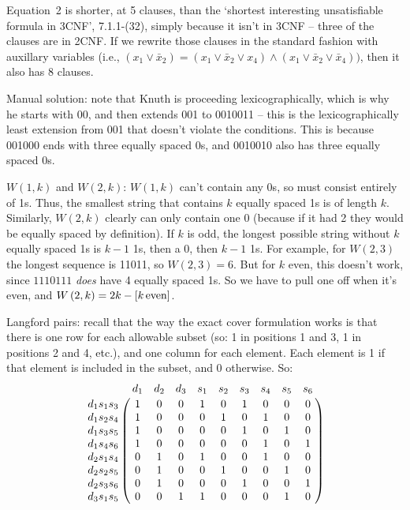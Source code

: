
 Equation~2 is shorter, at 5 clauses, than the `shortest
interesting unsatisfiable formula in 3CNF', 7.1.1-(32), simply because it isn't
in 3CNF -- three of the clauses are in 2CNF.  If we rewrite those clauses in 
the standard fashion with auxillary variables (i.e., $\left(x_1 \vee {\bar x}_2 \right) =
\left(x_1 \vee {\bar x}_2 \vee x_4\right) \wedge \left(x_1 \vee {\bar x}_2 \vee {\bar x}_4\right))$,
then it also has 8 clauses.


 Manual solution: note that Knuth is proceeding lexicographically,
which is why he starts with 00, and then extends 001 to 0010011 -- this
is the lexicographically least extension from 001 that doesn't violate
the conditions.  This is because 001000 ends with three equally spaced 0s,
and 0010010 also has three equally spaced 0s.

 $W\left(1, k\right)$ and $W\left(2, k\right)$: $W\left(1,k\right)$
can't contain any 0s, so must consist entirely of 1s.  Thus, the smallest
string that contains $k$ equally spaced 1s is of length $k$.  
Similarly, $W\left(2, k\right)$ clearly can only contain one 0 (because
if it had 2 they would be equally spaced by definition).  If $k$
is odd, the longest possible string without $k$ equally spaced 1s 
is $k-1$ 1s, then a 0, then $k-1$ 1s.  For example, for
$W\left(2, 3\right)$ the longest sequence is 11011, so
$W\left(2, 3\right) = 6$.  But for $k$ even, this doesn't
work, since $1110111$ {\it does} have 4 equally spaced 1s.
So we have to pull one off when it's even, and
$W\left(2, k\right) = 2 k - \left[ k\, {\rm even} \right]$.


 Langford pairs: recall that the way the exact cover
formulation works is that there is one row for each allowable subset
(so: 1 in positions 1 and 3, 1 in positions 2 and 4, etc.), and one
column for each element.  Each element is 1 if that element
is included in the subset, and 0 otherwise.  So:
$$
 \bordermatrix{
  ~                   & d_1 & d_2 & d_3 & s_1 & s_2 & s_3 & s_4 & s_5 & s_6 \cr
   d_1 s_1 s_3 & 1    & 0     & 0     & 1     & 0     & 1     & 0     & 0     & 0    \cr
   d_1 s_2 s_4 & 1    & 0     & 0     & 0     & 1     & 0     & 1     & 0     & 0    \cr
   d_1 s_3 s_5 & 1    & 0     & 0     & 0     & 0     & 1     & 0     & 1     & 0    \cr
   d_1 s_4 s_6 & 1    & 0     & 0     & 0     & 0     & 0     & 1     & 0     & 1    \cr
   d_2 s_1 s_4 & 0    & 1     & 0     & 1     & 0     & 0     & 1     & 0     & 0    \cr
   d_2 s_2 s_5 & 0    & 1     & 0     & 0     & 1     & 0     & 0     & 1     & 0    \cr
   d_2 s_3 s_6 & 0    & 1     & 0     & 0     & 0     & 1     & 0     & 0     & 1    \cr
   d_3 s_1 s_5 & 0    & 0     & 1     & 1     & 0     & 0     & 0     & 1     & 0    \cr
 } 
$$

